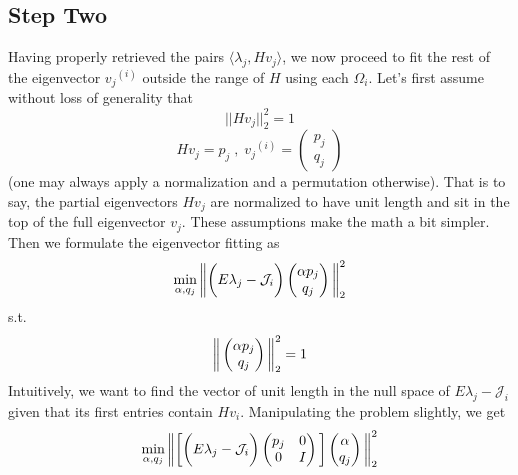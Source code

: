 \subsection{Step Two}
Having properly retrieved the pairs $\langle {\lambda_j}, H{v_j} \rangle$, we now proceed to fit the rest of the eigenvector ${v_j}^{(i)}$ outside the range of $H$ using each $\Omega_i$. Let's first assume without loss of generality that
\begin{equation}
    ||H{v_j}||_2^2 = 1
\end{equation}
\begin{equation}
    H{v_j} = p_j \;, \; 
    {v_j}^{(i)} = \begin{pmatrix}
        p_j \\
        q_j
    \end{pmatrix}
\end{equation}
(one may always apply a normalization and a permutation otherwise). That is to say, the partial eigenvectors $Hv_j$ are normalized to have unit length and sit in the top of the full eigenvector $v_j$. These assumptions make the math a bit simpler. Then we formulate the eigenvector fitting as
\begin{equation}
    \min_{\alpha, q_j} \bigg{ \| } \bigg{(}E {\lambda_j} - \mathcal{J}_i\bigg{)}
    \begin{pmatrix}
        \alpha p_j \\
        q_j
    \end{pmatrix}
     \bigg{ \| }_2^2
\end{equation}
s.t.
\begin{equation}
        \bigg{ \| } 
    \begin{pmatrix}
        \alpha p_j \\
        q_j
    \end{pmatrix}
     \bigg{ \| }_2^2 = 1
\end{equation}
Intuitively, we want to find the vector of unit length in the null space of $E {\lambda_j} - \mathcal{J}_i$ given that its first entries contain $H{v_i}$. Manipulating the problem slightly, we get
\begin{equation}
    \min_{\alpha, q_j} 
    \bigg{ \| }
    \bigg{[}
    \bigg{(}E {\lambda_j} - \mathcal{J}_i\bigg{)}
    \begin{pmatrix}
        p_j & 0 \\
        0 & I
    \end{pmatrix}
    \bigg{]}
    \begin{pmatrix}
        \alpha \\
        q_j
    \end{pmatrix}
     \bigg{ \| }_2^2
\end{equation}
